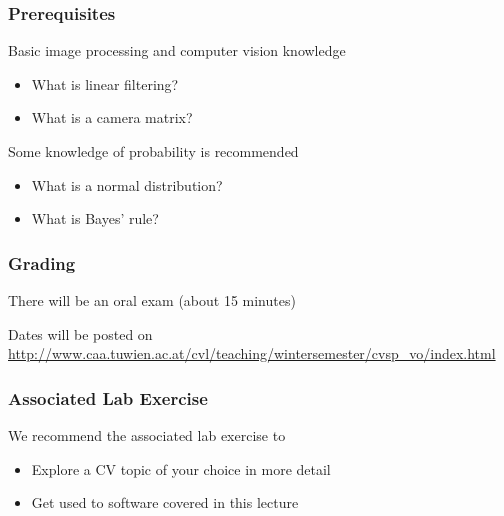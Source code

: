 \documentclass[xetex,professionalfont]{beamer}
\begin{document}

\begin{frame}
\frametitle{Prerequisites}

Basic image processing and computer vision knowledge
\begin{itemize}
	\item What is linear filtering?
	\item What is a camera matrix?
\end{itemize}

\bigskip
Some knowledge of probability is recommended
\begin{itemize}
	\item What is a normal distribution?
	\item What is Bayes' rule?
\end{itemize}

\end{frame}


\begin{frame}
\frametitle{Grading}

There will be an oral exam (about 15 minutes)

\bigskip
Dates will be posted on \url{http://www.caa.tuwien.ac.at/cvl/teaching/wintersemester/cvsp_vo/index.html}

\end{frame}


\begin{frame}
\frametitle{Associated Lab Exercise}

We recommend the associated lab exercise to
\begin{itemize}
	\item Explore a CV topic of your choice in more detail
	\item Get used to software covered in this lecture
\end{itemize}

\end{frame}
\end{document}

